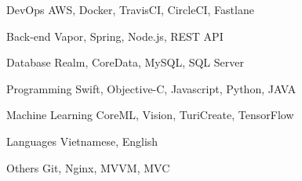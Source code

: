 

\begin{cvskills}

  \cvskill
    {DevOps} %
    {AWS, Docker, TravisCI, CircleCI, Fastlane} %

  \cvskill
    {Back-end} %
    {Vapor, Spring, Node.js, REST API} %

  \cvskill
    {Database} %
    {Realm, CoreData, MySQL, SQL Server} %

  \cvskill
    {Programming} %
    {Swift, Objective-C, Javascript, Python, JAVA} %

  \cvskill
    {Machine Learning} %
    {CoreML, Vision, TuriCreate, TensorFlow} %

  \cvskill
    {Languages} %
    {Vietnamese, English} %

  \cvskill
    {Others} %
    {Git, Nginx, MVVM, MVC} %

\end{cvskills}

